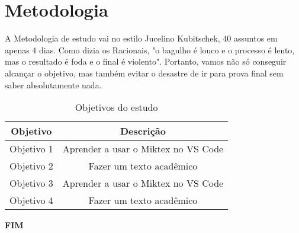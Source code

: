 \section{Metodologia}
A Metodologia de estudo vai no estilo Jucelino Kubitschek, 40 assuntos em apenas 4 dias. Como dizia os Racionais, "o bagulho é louco e o processo é lento, mas o resultado é foda e o final é violento". Portanto, vamos não só conseguir alcançar o objetivo, mas também evitar o desastre de ir para prova final sem saber absolutamente nada.

\begin{table}[h]
    \centering
    \begin{tabular}{|c|c|}
        \hline
        \textbf{Objetivo} & \textbf{Descrição} \\
        \hline
        Objetivo 1 & Aprender a usar o Miktex no VS Code \\
        \hline
        Objetivo 2 & Fazer um texto acadêmico \\
        \hline
        Objetivo 3 & Aprender a usar o Miktex no VS Code \\
        \hline
        Objetivo 4 & Fazer um texto acadêmico \\
        \hline
    \end{tabular}
    \caption{Objetivos do estudo}
    \label{tab:objetivos}
\end{table}

\begin{center}
    \textbf{\large{FIM}}
\end{center}



